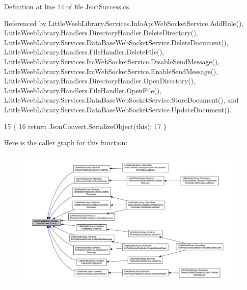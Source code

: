 Definition at line 14 of file Json\+Success.\+cs.



Referenced by Little\+Weeb\+Library.\+Services.\+Info\+Api\+Web\+Socket\+Service.\+Add\+Rule(), Little\+Weeb\+Library.\+Handlers.\+Directory\+Handler.\+Delete\+Directory(), Little\+Weeb\+Library.\+Services.\+Data\+Base\+Web\+Socket\+Service.\+Delete\+Document(), Little\+Weeb\+Library.\+Handlers.\+File\+Handler.\+Delete\+File(), Little\+Weeb\+Library.\+Services.\+Irc\+Web\+Socket\+Service.\+Disable\+Send\+Message(), Little\+Weeb\+Library.\+Services.\+Irc\+Web\+Socket\+Service.\+Enable\+Send\+Message(), Little\+Weeb\+Library.\+Handlers.\+Directory\+Handler.\+Open\+Directory(), Little\+Weeb\+Library.\+Handlers.\+File\+Handler.\+Open\+File(), Little\+Weeb\+Library.\+Services.\+Data\+Base\+Web\+Socket\+Service.\+Store\+Document(), and Little\+Weeb\+Library.\+Services.\+Data\+Base\+Web\+Socket\+Service.\+Update\+Document().


\begin{DoxyCode}
15         \{
16             \textcolor{keywordflow}{return} JsonConvert.SerializeObject(\textcolor{keyword}{this});
17         \}
\end{DoxyCode}
Here is the caller graph for this function\+:\nopagebreak
\begin{figure}[H]
\begin{center}
\leavevmode
\includegraphics[width=350pt]{class_little_weeb_library_1_1_models_1_1_json_success_a407103dc37a77aaf47a782296bab7518_icgraph}
\end{center}
\end{figure}
\mbox{\label{class_little_weeb_library_1_1_models_1_1_json_success_abd0bbcc176b7accbefc425a70816b12a}} 
